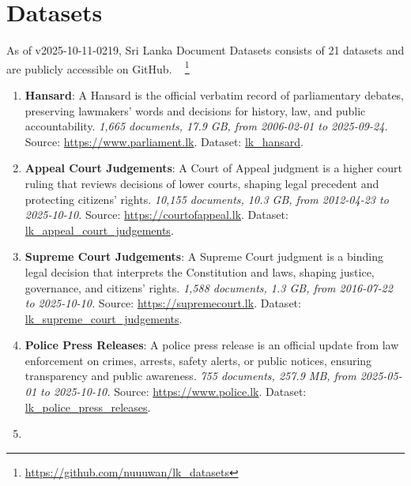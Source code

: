 \documentclass[10pt,a4paper]{article}%
\begin{document}
%
\section{Datasets}%
\label{sec:Datasets}%
As of v2025-10-11-0219, Sri Lanka Document Datasets
  consists of 21 datasets
 and are publicly accessible on GitHub.%
~%
\footnote{\href{https://github.com/nuuuwan/lk\_datasets}{https://github.com/nuuuwan/lk\_datasets}}%

%
\begin{enumerate}%
\item%
\textbf{Hansard}: A Hansard is the official verbatim record of parliamentary debates, preserving lawmakers’ words and decisions for history, law, and public accountability.\textit{ 1,665 documents, 17.9 GB, from 2006{-}02{-}01 to 2025{-}09{-}24.} Source: \href{https://www.parliament.lk}{https://www.parliament.lk}. Dataset: \href{https://github.com/nuuuwan/lk\_hansard/tree/data/data/lk\_hansard}{lk\_hansard}.%
\item%
\textbf{Appeal Court Judgements}: A Court of Appeal judgment is a higher court ruling that reviews decisions of lower courts, shaping legal precedent and protecting citizens’ rights.\textit{ 10,155 documents, 10.3 GB, from 2012{-}04{-}23 to 2025{-}10{-}10.} Source: \href{https://courtofappeal.lk}{https://courtofappeal.lk}. Dataset: \href{https://github.com/nuuuwan/lk\_appeal\_court\_judgements/tree/data/data/lk\_appeal\_court\_judgements}{lk\_appeal\_court\_judgements}.%
\item%
\textbf{Supreme Court Judgements}: A Supreme Court judgment is a binding legal decision that interprets the Constitution and laws, shaping justice, governance, and citizens’ rights.\textit{ 1,588 documents, 1.3 GB, from 2016{-}07{-}22 to 2025{-}10{-}10.} Source: \href{https://supremecourt.lk}{https://supremecourt.lk}. Dataset: \href{https://github.com/nuuuwan/lk\_supreme\_court\_judgements/tree/data/data/lk\_supreme\_court\_judgements}{lk\_supreme\_court\_judgements}.%
\item%
\textbf{Police Press Releases}: A police press release is an official update from law enforcement on crimes, arrests, safety alerts, or public notices, ensuring transparency and public awareness.\textit{ 755 documents, 257.9 MB, from 2025{-}05{-}01 to 2025{-}10{-}10.} Source: \href{https://www.police.lk}{https://www.police.lk}. Dataset: \href{https://github.com/nuuuwan/lk\_police\_press\_releases/tree/data/data/lk\_police\_press\_releases}{lk\_police\_press\_releases}.%
\item%

\end{enumerate}
\end{document}
